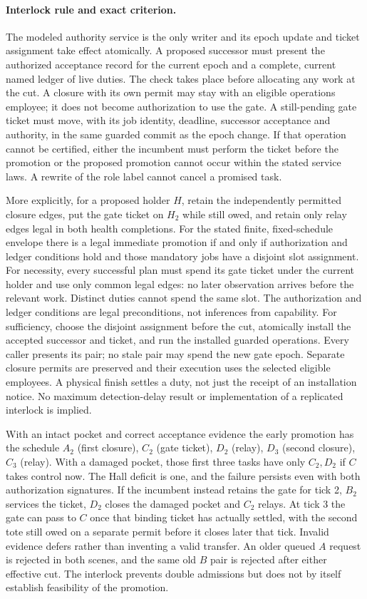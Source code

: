 \documentclass[11pt]{article}
\begin{document}
\paragraph{Interlock rule and exact criterion.}
The modeled authority service is the only writer and its epoch update and ticket assignment take effect atomically. A proposed successor must present the authorized acceptance record for the current epoch and a complete, current named ledger of live duties. The check takes place before allocating any work at the cut. A closure with its own permit may stay with an eligible operations employee; it does not become authorization to use the gate. A still-pending gate ticket must move, with its job identity, deadline, successor acceptance and authority, in the same guarded commit as the epoch change. If that operation cannot be certified, either the incumbent must perform the ticket before the promotion or the proposed promotion cannot occur within the stated service laws. A rewrite of the role label cannot cancel a promised task.

More explicitly, for a proposed holder $H$, retain the independently permitted closure edges, put the gate ticket on $H_2$ while still owed, and retain only relay edges legal in both health completions. For the stated finite, fixed-schedule envelope there is a legal immediate promotion if and only if authorization and ledger conditions hold and those mandatory jobs have a disjoint slot assignment. For necessity, every successful plan must spend its gate ticket under the current holder and use only common legal edges: no later observation arrives before the relevant work. Distinct duties cannot spend the same slot. The authorization and ledger conditions are legal preconditions, not inferences from capability. For sufficiency, choose the disjoint assignment before the cut, atomically install the accepted successor and ticket, and run the installed guarded operations. Every caller presents its pair; no stale pair may spend the new gate epoch. Separate closure permits are preserved and their execution uses the selected eligible employees. A physical finish settles a duty, not just the receipt of an installation notice. No maximum detection-delay result or implementation of a replicated interlock is implied.

With an intact pocket and correct acceptance evidence the early promotion has the schedule $A_2$ (first closure), $C_2$ (gate ticket), $D_2$ (relay), $D_3$ (second closure), $C_3$ (relay). With a damaged pocket, those first three tasks have only $C_2,D_2$ if $C$ takes control now. The Hall deficit is one, and the failure persists even with both authorization signatures. If the incumbent instead retains the gate for tick 2, $B_2$ services the ticket, $D_2$ closes the damaged pocket and $C_2$ relays. At tick 3 the gate can pass to $C$ once that binding ticket has actually settled, with the second tote still owed on a separate permit before it closes later that tick. Invalid evidence defers rather than inventing a valid transfer. An older queued $A$ request is rejected in both scenes, and the same old $B$ pair is rejected after either effective cut. The interlock prevents double admissions but does not by itself establish feasibility of the promotion.
\end{document}
